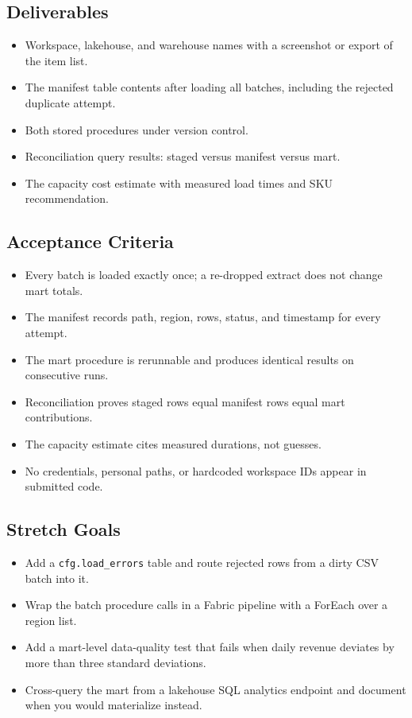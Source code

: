\subsection*{Deliverables}
\begin{itemize}
    \item Workspace, lakehouse, and warehouse names with a screenshot or export of the item list.
    \item The manifest table contents after loading all batches, including the rejected duplicate attempt.
    \item Both stored procedures under version control.
    \item Reconciliation query results: staged versus manifest versus mart.
    \item The capacity cost estimate with measured load times and SKU recommendation.
\end{itemize}

\subsection*{Acceptance Criteria}
\begin{itemize}
    \item[\(\square\)] Every batch is loaded exactly once; a re-dropped extract does not change mart totals.
    \item[\(\square\)] The manifest records path, region, rows, status, and timestamp for every attempt.
    \item[\(\square\)] The mart procedure is rerunnable and produces identical results on consecutive runs.
    \item[\(\square\)] Reconciliation proves staged rows equal manifest rows equal mart contributions.
    \item[\(\square\)] The capacity estimate cites measured durations, not guesses.
    \item[\(\square\)] No credentials, personal paths, or hardcoded workspace IDs appear in submitted code.
\end{itemize}

\subsection*{Stretch Goals}
\begin{itemize}
    \item Add a \texttt{cfg.load\_errors} table and route rejected rows from a dirty CSV batch into it.
    \item Wrap the batch procedure calls in a Fabric pipeline with a ForEach over a region list.
    \item Add a mart-level data-quality test that fails when daily revenue deviates by more than three standard deviations.
    \item Cross-query the mart from a lakehouse SQL analytics endpoint and document when you would materialize instead.
\end{itemize}
